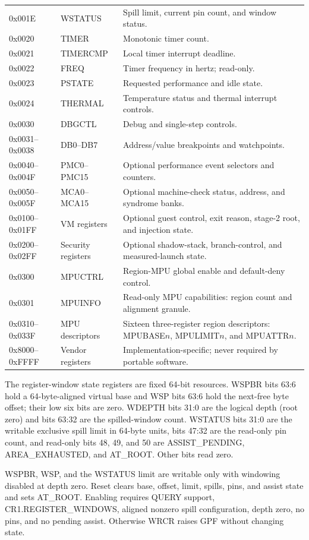 \documentclass[11pt]{article}
\begin{document}
\begin{longtable}{@{}L{1.7cm}L{2.8cm}L{7.4cm}@{}}
0x001E & WSTATUS & Spill limit, current pin count, and window status. \\
0x0020 & TIMER & Monotonic timer count. \\
0x0021 & TIMERCMP & Local timer interrupt deadline. \\
0x0022 & FREQ & Timer frequency in hertz; read-only. \\
0x0023 & PSTATE & Requested performance and idle state. \\
0x0024 & THERMAL & Temperature status and thermal interrupt controls. \\
0x0030 & DBGCTL & Debug and single-step controls. \\
0x0031--0x0038 & DB0--DB7 & Address/value breakpoints and watchpoints. \\
0x0040--0x004F & PMC0--PMC15 & Optional performance event selectors and counters. \\
0x0050--0x005F & MCA0--MCA15 & Optional machine-check status, address, and syndrome banks. \\
0x0100--0x01FF & VM registers & Optional guest control, exit reason, stage-2 root, and injection state. \\
0x0200--0x02FF & Security registers & Optional shadow-stack, branch-control, and measured-launch state. \\
0x0300 & MPUCTRL & Region-MPU global enable and default-deny control. \\
0x0301 & MPUINFO & Read-only MPU capabilities: region count and alignment granule. \\
0x0310--0x033F & MPU descriptors & Sixteen three-register region descriptors: MPUBASE$n$, MPULIMIT$n$, and MPUATTR$n$. \\
0x8000--0xFFFF & Vendor registers & Implementation-specific; never required by portable software. \\ \bottomrule
\end{longtable}

The register-window state registers are fixed 64-bit resources. WSPBR bits
63:6 hold a 64-byte-aligned virtual base and WSP bits 63:6 hold the next-free
byte offset; their low six bits are zero. WDEPTH bits 31:0 are the logical
depth (root zero) and bits 63:32 are the spilled-window count. WSTATUS bits
31:0 are the writable exclusive spill limit in 64-byte units, bits 47:32 are
the read-only pin count, and read-only bits 48, 49, and 50 are
ASSIST\_PENDING, AREA\_EXHAUSTED, and AT\_ROOT. Other bits read zero.

WSPBR, WSP, and the WSTATUS limit are writable only with windowing disabled at
depth zero. Reset clears base, offset, limit, spills, pins, and assist state and
sets AT\_ROOT. Enabling requires QUERY support, CR1.REGISTER\_WINDOWS, aligned
nonzero spill configuration, depth zero, no pins, and no pending assist.
Otherwise WRCR raises GPF without changing state.
\end{document}
